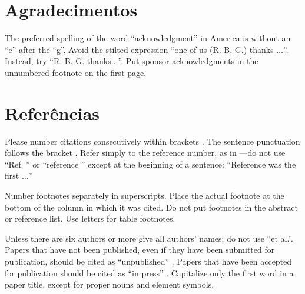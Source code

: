 \documentclass[conference]{IEEEtran}
\begin{document}
\section*{Agradecimentos}

The preferred spelling of the word ``acknowledgment'' in America is without an ``e'' after the ``g''. Avoid the stilted expression ``one of us (R. B. G.) thanks $\ldots$''. Instead, try ``R. B. G. thanks$\ldots$''. Put sponsor acknowledgments in the unnumbered footnote on the first page.

\section*{Referências}

Please number citations consecutively within brackets \cite{eason1955certain}.
The sentence punctuation follows the bracket \cite{clerk1892maxwell}. Refer simply to the reference number, as in \cite{jacobs1963fine}---do not use ``Ref. \cite{jacobs1963fine}'' or ``reference \cite{jacobs1963fine}'' except at
the beginning of a sentence: ``Reference \cite{jacobs1963fine} was the first $\ldots$''

Number footnotes separately in superscripts. Place the actual footnote at
the bottom of the column in which it was cited. Do not put footnotes in the
abstract or reference list. Use letters for table footnotes.

Unless there are six authors or more give all authors' names; do not use
``et al.''. Papers that have not been published, even if they have been
submitted for publication, should be cited as ``unpublished'' \cite{nicoletitle}. Papers
that have been accepted for publication should be cited as ``in press'' \cite{elissatitle}.
Capitalize only the first word in a paper title, except for proper nouns and
element symbols.
\end{document}
